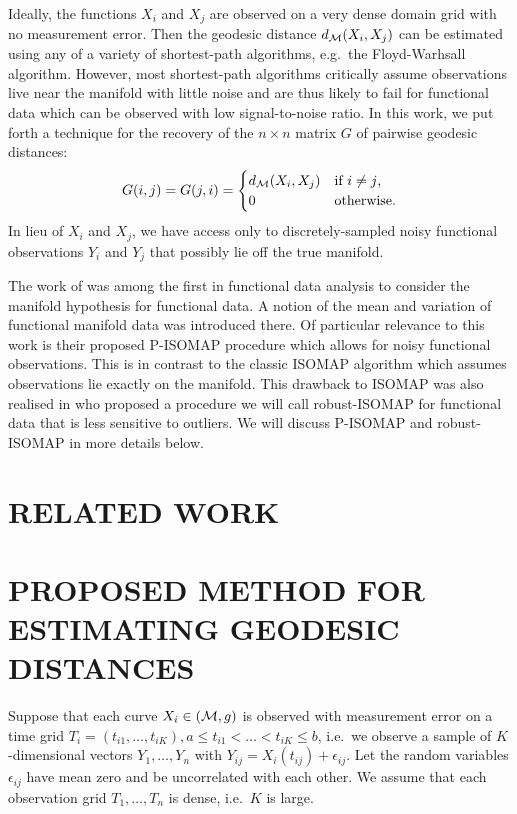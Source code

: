 Ideally, the functions \(X_i\) and \(X_j\) are observed on a very dense
domain grid with no measurement error. Then the geodesic distance
\(d_{\mathcal{M}}(X_i,X_j)\) can be estimated using any of a variety of
shortest-path algorithms, e.g.~the Floyd-Warhsall \cite{Floyd1962}
algorithm. However, most shortest-path algorithms critically assume
observations live near the manifold with little noise \cite{Yeh2005} and
are thus likely to fail for functional data which can be observed with
low signal-to-noise ratio. In this work, we put forth a technique for
the recovery of the \(n{\times}n\) matrix \(G\) of pairwise geodesic
distances: \[
G(i,j)=G(j,i) = \begin{cases} 
      d_{\mathcal{M}} (X_i,X_j) & \textrm{if $i\neq j$,} \\
      0 & \textrm{otherwise.}
   \end{cases}
\] In lieu of \(X_i\) and \(X_j\), we have access only to
discretely-sampled noisy functional observations \(Y_i\) and \(Y_j\)
that possibly lie off the true manifold.

The work of \cite{ChenMuller2012} was among the first in functional data
analysis to consider the manifold hypothesis for functional data. A
notion of the mean and variation of functional manifold data was
introduced there. Of particular relevance to this work is their proposed
P-ISOMAP procedure which allows for noisy functional observations. This
is in contrast to the classic ISOMAP algorithm \cite{Tenenbaum2000}
which assumes observations lie exactly on the manifold. This drawback to
ISOMAP was also realised in \cite{Dimeglio2014} who proposed a procedure
we will call robust-ISOMAP for functional data that is less sensitive to
outliers. We will discuss P-ISOMAP and robust-ISOMAP in more details
below.

\section{RELATED WORK}

\section{PROPOSED METHOD FOR ESTIMATING GEODESIC
DISTANCES}\label{proposed-method-for-estimating-geodesic-distances}

Suppose that each curve \(X_i \in (\mathcal{M},g)\) is observed with measurement
error on a time grid
\(T_i=(t_{i1},\ldots,t_{iK}), a \le t_{i1} < \ldots < t_{iK} \le b\),
i.e.~we observe a sample of \(K\)-dimensional vectors \(Y_1,\ldots,Y_n\)
with \(Y_{ij} = X_i(t_{ij}) + \epsilon_{ij}\). Let the random variables
\(\epsilon_{ij}\) have mean zero and be uncorrelated with each other. We
assume that each observation grid \(T_1,\ldots,T_n\) is dense,
i.e.~\(K\) is large.

